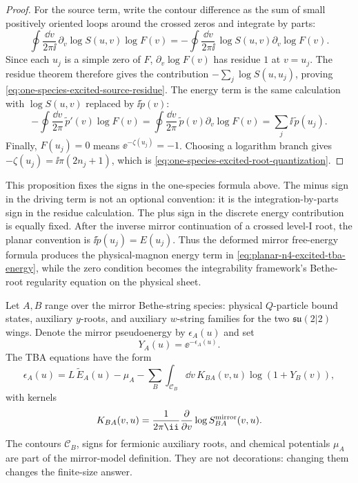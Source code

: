 \begin{proof}
For the source term, write the contour difference as the sum of small
positively oriented loops around the crossed zeros and integrate by parts:
\[
  \oint
  \frac{\dd v}{2\pi\ii}\,
  \partial_v\log S(u,v)\log F(v)
  =
  -
  \oint
  \frac{\dd v}{2\pi\ii}\,
  \log S(u,v)\partial_v\log F(v).
\]
Since each \(u_j\) is a simple zero of \(F\),
\(\partial_v\log F(v)\) has residue \(1\) at \(v=u_j\).  The residue theorem
therefore gives the contribution
\(-\sum_j\log S(u,u_j)\), proving
\eqref{eq:one-species-excited-source-residue}.  The energy term is the same
calculation with \(\log S(u,v)\) replaced by \(\ii\widetilde p(v)\):
\[
  -\oint\frac{\dd v}{2\pi}\,
  \widetilde p'(v)\log F(v)
  =
  \oint\frac{\dd v}{2\pi}\,
  \widetilde p(v)\partial_v\log F(v)
  =
  \sum_j \ii\,\widetilde p(u_j).
\]
Finally, \(F(u_j)=0\) means \(\ee^{-\zeta(u_j)}=-1\).  Choosing a logarithm
branch gives \(-\zeta(u_j)=\ii\pi(2n_j+1)\), which is
\eqref{eq:one-species-excited-root-quantization}.
\end{proof}

This proposition fixes the signs in the one-species formula above.  The
minus sign in the driving term is not an optional convention: it is the
integration-by-parts sign in the residue calculation.  The plus sign in the
discrete energy contribution is equally fixed.  After the inverse mirror
continuation of a crossed level-I root, the planar convention is
\(\ii\widetilde p(u_j)=E(u_j)\).  Thus the deformed mirror free-energy
formula produces the physical-magnon energy term in
\eqref{eq:planar-n4-excited-tba-energy}, while the zero condition becomes the
integrability framework's Bethe-root regularity equation on the physical
sheet.

Let \(A,B\) range over the mirror Bethe-string species: physical
\(Q\)-particle bound states, auxiliary \(y\)-roots, and auxiliary \(w\)-string
families for the two \(\mathfrak{su}(2|2)\) wings.  Denote the mirror
pseudoenergy by \(\epsilon_A(u)\) and set
\[
  Y_A(u)=\ee^{-\epsilon_A(u)}.
\]
The TBA equations have the form
\begin{equation}
  \epsilon_A(u)
  =
  L\,\widetilde E_A(u)-\mu_A
  -
  \sum_B\int_{\mathcal C_B}\dd v\,
  K_{BA}(v,u)\log\!\left(1+Y_B(v)\right),
  \label{eq:planar-n4-mirror-tba-general}
\end{equation}
with kernels
\[
  K_{BA}(v,u)
  =
  \frac{1}{2\pi\ii}\frac{\partial}{\partial v}
  \log S_{BA}^{\rm mirror}(v,u).
\]
The contours \(\mathcal C_B\), signs for fermionic auxiliary roots, and
chemical potentials \(\mu_A\) are part of the mirror-model definition.  They
are not decorations: changing them changes the finite-size answer.

